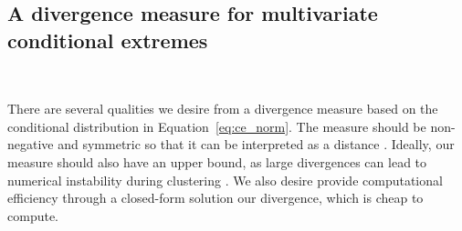 \documentclass[12pt]{article}
\begin{document}
\subsection{A divergence measure for multivariate conditional extremes}~\label{subsec:div}

There are several qualities we desire from a divergence measure based on the conditional distribution in Equation~\eqref{eq:ce_norm}.
The measure should be non-negative and symmetric so that it can be interpreted as a distance \citep{Vijendra2015}.
Ideally, our measure should also have an upper bound, as large divergences can lead to numerical instability during clustering \citep{Thiagarajan2025}. %
We also desire provide computational efficiency through a closed-form solution our divergence, which is cheap to compute. 
\end{document}
